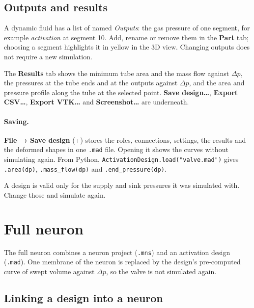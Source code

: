\documentclass[11pt,a4paper]{article}
\newcommand{\code}[1]{\texttt{#1}}
\newcommand{\menu}[1]{\textsf{\textbf{#1}}}
\newcommand{\key}[1]{\fbox{\footnotesize\textsf{#1}}}
\begin{document}
\subsection{Outputs and results}

A dynamic fluid has a list of named \emph{Outputs}: the gas pressure of one segment, for example \emph{activation}
at segment 10. Add, rename or remove them in the \menu{Part} tab; choosing a segment highlights it in yellow in the 3D
view. Changing outputs does not require a new simulation.

The \menu{Results} tab shows the minimum tube area and the mass flow against $\Delta p$, the pressures at the tube
ends and at the outputs against $\Delta p$, and the area and pressure profile along the tube at the selected point.
\menu{Save design…}, \menu{Export CSV…}, \menu{Export VTK…} and \menu{Screenshot…} are underneath.

\paragraph{Saving.} \menu{File → Save design} (\key{Ctrl}+\key{S}) stores the roles, connections, settings, the
results and the deformed shapes in one \code{.mad} file. Opening it shows the curves without simulating again. From
Python, \code{ActivationDesign.load("valve.mad")} gives \code{.area(dp)}, \code{.mass\_flow(dp)} and
\code{.end\_pressure(dp)}.

\begin{warn}
A design is valid only for the supply and sink pressures it was simulated with. Change those and simulate again.
\end{warn}

\section{Full neuron}
\label{sec:full}

The full neuron combines a neuron project (\code{.mns}) and an activation design (\code{.mad}). One membrane of the
neuron is replaced by the design's pre-computed curve of swept volume against $\Delta p$, so the valve is not
simulated again.

\subsection{Linking a design into a neuron}
\end{document}
